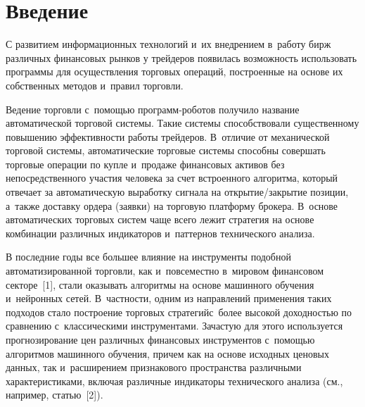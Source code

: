 {

  
\vspace*{2pt}



\thispagestyle{headings}

\begin{multicols}{2}

\label{st\stat}

\section{Введение}

\vspace*{-4pt}

  С развитием информационных технологий и~их внедрением в~работу бирж различных 
финансовых рынков у трейдеров появилась возможность использовать программы для 
осуществления торговых операций, построенные на основе их собственных методов 
и~правил торговли. 

Ведение торговли с~помощью про\-грамм-ро\-бо\-тов получило название 
автоматической торговой системы. Такие сис\-те\-мы способствовали существенному 
повышению эффективности работы трейдеров. В~отличие от механической торговой 
системы, автоматические торговые системы способны совершать торговые операции по 
купле и~продаже финансовых активов без непосредственного участия человека за счет 
встроенного алгоритма, который отвечает за автоматическую выработку сигнала на  
от\-кры\-тие/за\-кры\-тие позиции, а~также доставку ордера (заявки) на торговую платформу 
брокера. В~основе автоматических торговых сис\-тем чаще всего лежит стратегия на основе 
комбинации различных индикаторов и~паттернов технического анализа.
  
  В последние годы все большее влияние на инструменты подобной автоматизированной 
тор\-гов\-ли, как и~повсеместно в~мировом финансовом секторе~[1], стали оказывать алгоритмы 
на основе \mbox{машинного} обучения и~нейронных сетей. В~част\-ности, одним из направлений 
применения таких подходов стало построение торговых стратегий\linebreak с~более высокой 
доходностью по сравнению с~классическими инструментами. Зачастую для этого 
используется прогнозирование цен различных финансовых инструментов с~помощью 
алгоритмов машинного обучения, причем как на основе исходных ценовых данных, так 
и~расширением признакового пространства различными характеристиками, включая 
различные индикаторы технического анализа (см., например, статью~[2]). 


\end{multicols}}
